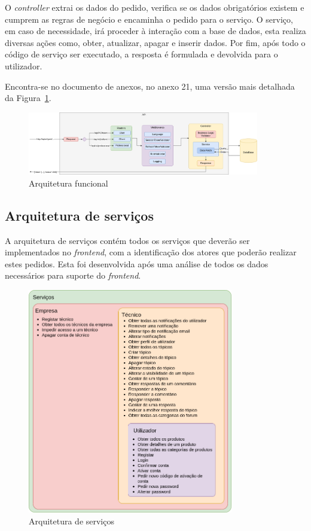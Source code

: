 O \textit{controller} extrai os dados do pedido, verifica se os dados obrigatórios existem e cumprem as regras de negócio e encaminha o pedido para o serviço. O serviço, em caso de necessidade, irá proceder à interação com a base de dados, esta realiza diversas ações como, obter, atualizar, apagar e inserir dados. Por fim, após todo o código de serviço ser executado, a resposta é formulada e devolvida para o utilizador.

Encontra-se no documento de anexos, no anexo 21, uma versão mais detalhada da Figura~\ref*{fig:47}.

\begin{figure}[htb]
  \centering
  \includegraphics[width=0.9\textwidth]{images/Arquiteturas/arquitetura_funcional.png}
  \caption{Arquitetura funcional}
  \label{fig:47}
\end{figure}

\newpage

\subsection{Arquitetura de serviços}
A arquitetura de serviços contém todos os serviços que deverão ser implementados no \textit{frontend}, com a identificação dos atores que poderão realizar estes pedidos. Esta foi desenvolvida após uma análise de todos os dados necessários para suporte do \textit{frontend}.

\begin{figure}[htb]
  \centering
  \includegraphics[width=0.8\textwidth]{images/Arquiteturas/arquitetura_de_componentes_final.png}
  \caption{Arquitetura de serviços}
  \label{fig:48}
\end{figure}

